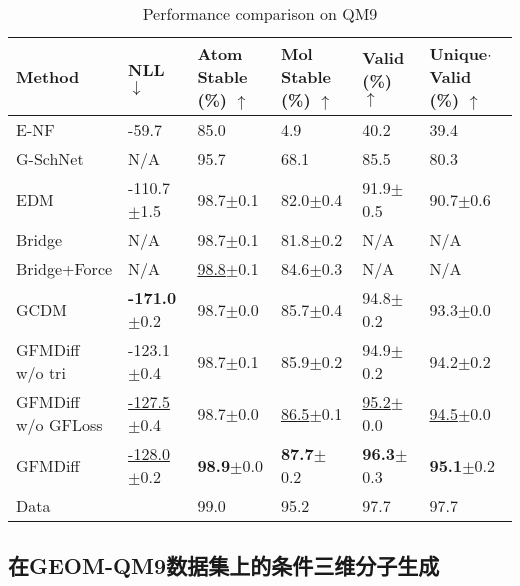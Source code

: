 \begin{table}[h]
    \centering
    \caption{Performance comparison on QM9}
    \label{tab:exp_qm9}
    \begin{tabular}{llllll}
    \hline
    Method & NLL$\downarrow$ & \makecell[l]{Atom\\Stable\\(\%) $\uparrow$} & \makecell[l]{Mol\\Stable\\(\%) $\uparrow$} & \makecell[l]{Valid\\(\%) $\uparrow$} & \makecell[l]{Unique$\cdot$Valid\\(\%) $\uparrow$} \\
    \hline
    E-NF & -59.7 & 85.0 & 4.9 & 40.2 & 39.4 \\
    G-SchNet & N/A & 95.7 & 68.1 & 85.5 & 80.3 \\
    EDM & -110.7$\pm$1.5 & 98.7$\pm$0.1 & 82.0$\pm$0.4 & 91.9$\pm$0.5 & 90.7$\pm$0.6 \\
    Bridge & N/A & 98.7$\pm$0.1 & 81.8$\pm$0.2 & N/A & N/A \\
    Bridge+Force & N/A & \underline{98.8}$\pm$0.1 & 84.6$\pm$0.3 & N/A & N/A \\
    GCDM & \textbf{-171.0}$\pm$0.2 & 98.7$\pm$0.0 & 85.7$\pm$0.4 & 94.8$\pm$0.2 & 93.3$\pm$0.0 \\
    \hline
    \makecell[l]{GFMDiff\\w/o tri} & -123.1$\pm$0.4 & 98.7$\pm$0.1 & 85.9$\pm$0.2 & 94.9$\pm$0.2 & 94.2$\pm$0.2 \\
    \makecell[l]{GFMDiff\\w/o GFLoss} & \underline{-127.5}$\pm$0.4 & 98.7$\pm$0.0 & \underline{86.5}$\pm$0.1 & \underline{95.2}$\pm$0.0 & \underline{94.5}$\pm$0.0 \\
    GFMDiff & \underline{-128.0}$\pm$0.2 & \textbf{98.9}$\pm$0.0 & \textbf{87.7}$\pm$0.2 & \textbf{96.3}$\pm$0.3 & \textbf{95.1}$\pm$0.2 \\
    \hline
    Data &  & 99.0 & 95.2 & 97.7 & 97.7 \\
    \hline
    \end{tabular}
\end{table}

\subsection{在GEOM-QM9数据集上的条件三维分子生成}

